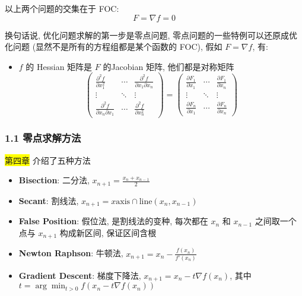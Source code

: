 以上两个问题的交集在于 FOC: 
$$ F = \nabla f = 0 $$

\begin{note}
换句话说, 优化问题求解的第一步是零点问题, 零点问题的一些特例可以还原成优化问题 (显然不是所有的方程组都是某个函数的 FOC), 假如 $F = \nabla f$, 有:
\begin{itemize}
    \item $f$ 的 Hessian 矩阵是 $F$ 的Jacobian 矩阵, 他们都是对称矩阵
    $$
    \begin{pmatrix}
        \frac{\partial^2 f}{\partial x_1^2} & \cdots & \frac{\partial^2 f}{\partial x_1 \partial x_n} \\
        \vdots & \ddots & \vdots \\
        \frac{\partial^2 f}{\partial x_n \partial x_1} & \cdots & \frac{\partial^2 f}{\partial x_n^2}
    \end{pmatrix} = \begin{pmatrix}
        \frac{\partial F_1}{\partial x_1} & \cdots & \frac{\partial F_1}{\partial x_n} \\
        \vdots & \ddots & \vdots \\
        \frac{\partial F_n}{\partial x_1} & \cdots & \frac{\partial F_n}{\partial x_n}
    \end{pmatrix}
$$
\end{itemize}
\end{note}

\subsubsection*{1.1 零点求解方法}
\colorbox{yellow}{第四章} 介绍了五种方法
\begin{itemize}
    \item \textbf{Bisection}: 二分法, $x_{n+1} = \frac{x_n + x_{n-1}}{2}$
    \item \textbf{Secant}: 割线法, $x_{n+1} = x \text{axis} \cap \text{line}(x_n, x_{n-1})$
    \item \textbf{False Position}: 假位法, 是割线法的变种, 每次都在 $x_n$ 和 $x_{n-1}$ 之间取一个点与 $x_{n+1}$ 构成新区间, 保证区间含根
    \item \textbf{Newton Raphson}: 牛顿法, $x_{n+1} = x_n - \frac{f(x_n)}{f'(x_n)}$
    \item \textbf{Gradient Descent}: 梯度下降法, $x_{n+1} = x_n - t \nabla f(x_n)$, 其中 $t = \arg\min_{t > 0} f(x_n - t \nabla f(x_n))$
    
\end{itemize}

